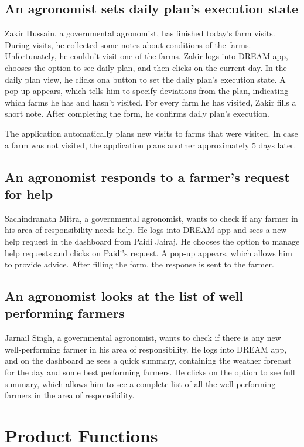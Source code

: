 \subsection*{An agronomist sets daily plan's execution state}
Zakir Hussain, a governmental agronomist, has finished today's farm visits. During visits, he collected some notes about conditions of the farms. Unfortunately, he couldn't visit one of the farms. Zakir logs into DREAM app, chooses the option to see daily plan, and then clicks on the current day. In the daily plan view, he clicks ona button to set the daily plan's execution state. A pop-up appears, which tells him to specify deviations from the plan, indicating which farms he has and hasn't visited. For every farm he has visited, Zakir fills a short note. After completing the form, he confirms daily plan's execution.

The application automatically plans new visits to farms that were visited. In case a farm was not visited, the application plans another approximately 5 days later.

\subsection*{An agronomist responds to a farmer’s request for help} 
Sachindranath Mitra, a governmental agronomist, wants to check if any farmer in his area of responsibility needs help. He logs into DREAM app and sees a new help request in the dashboard from Paidi Jairaj. He chooses the option to manage help requests and clicks on Paidi's request. A pop-up appears, which allows him to provide advice. After filling the form, the response is sent to the farmer.

\subsection*{An agronomist looks at the list of well performing farmers}
Jarnail Singh, a governmental agronomist, wants to check if there is any new well-performing farmer in his area of responsibility. He logs into DREAM app, and on the dashboard he sees a quick summary, containing the weather forecast for the day and some best performing farmers. He clicks on the option to see full summary, which allows him to see a complete list of all the well-performing farmers in the area of responsibility. 

\section{Product Functions}

